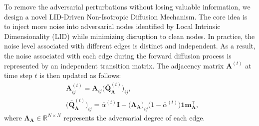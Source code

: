 To remove the adversarial perturbations without losing valuable information, we design a novel LID-Driven Non-Isotropic Diffusion Mechanism. The core idea is to inject more noise into adversarial nodes identified by Local Intrinsic Dimensionality (LID) while minimizing disruption to clean nodes.
In practice, the noise level associated with different edges is distinct and independent. 
As a result, the noise associated with each edge during the forward diffusion process is represented by an independent transition matrix. The adjacency matrix $\mathbf{A}^{(t)}$ at time step $t$ is then updated as follows:
\begin{align}
    &\mathbf{A}^{(t)}_{ij} =\mathbf{A}_{ij}\big(\bar{\mathbf{Q}}_{\mathbf{A}}^{(t)}\big)_{ij}, \label{non_isotropic_transition_matrx} \\
    &\big(\bar{\mathbf{Q}}_{\mathbf{A}}^{(t)}\big)_{ij} = \bar{\alpha}^{(t)} \mathbf{I} + \big(\mathbf{\Lambda}_{\mathbf{A}}\big)_{ij}\big(1-\bar{\alpha}^{(t)}\big)\mathbf{1} \mathbf{m}_{\mathbf{A}}^{\top},
\end{align}
where $\mathbf{\Lambda}_{\mathbf{A}} \in \mathbb{R}^{N \times N}$ represents the adversarial degree of each edge. 

